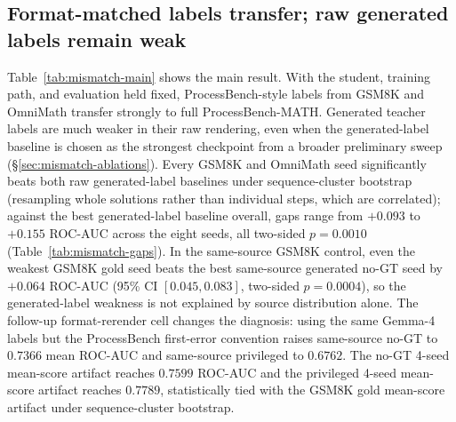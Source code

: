\documentclass[11pt]{article}
\begin{document}
\subsection{Format-matched labels transfer; raw generated labels remain weak}
\label{sec:mismatch-main}
Table~\ref{tab:mismatch-main} shows the main result. With the student,
training path, and evaluation held fixed, ProcessBench-style labels from
GSM8K and OmniMath transfer strongly to full ProcessBench-MATH. Generated
teacher labels are much weaker in their raw rendering, even when the generated-label baseline is
chosen as the strongest checkpoint from a broader preliminary sweep
(\S\ref{sec:mismatch-ablations}). Every GSM8K and OmniMath seed
significantly beats both raw generated-label baselines under sequence-cluster
bootstrap (resampling whole solutions rather than individual steps, which
are correlated); against the best generated-label baseline overall, gaps
range from $+0.093$ to $+0.155$ ROC-AUC across the eight seeds, all
two-sided $p = 0.0010$ (Table~\ref{tab:mismatch-gaps}).
In the same-source GSM8K control, even the weakest GSM8K gold seed beats the
best same-source generated no-GT seed by $+0.064$ ROC-AUC (95\% CI
$[0.045,0.083]$, two-sided $p=0.0004$), so the generated-label weakness is
not explained by source distribution alone.
The follow-up format-rerender cell changes the diagnosis: using the same
Gemma-4 labels but the ProcessBench first-error convention raises same-source
no-GT to $0.7366$ mean ROC-AUC and same-source privileged to $0.6762$.
The no-GT 4-seed mean-score artifact reaches $0.7599$ ROC-AUC and the
privileged 4-seed mean-score artifact reaches $0.7789$, statistically tied
with the GSM8K gold mean-score artifact under sequence-cluster bootstrap.
\end{document}
